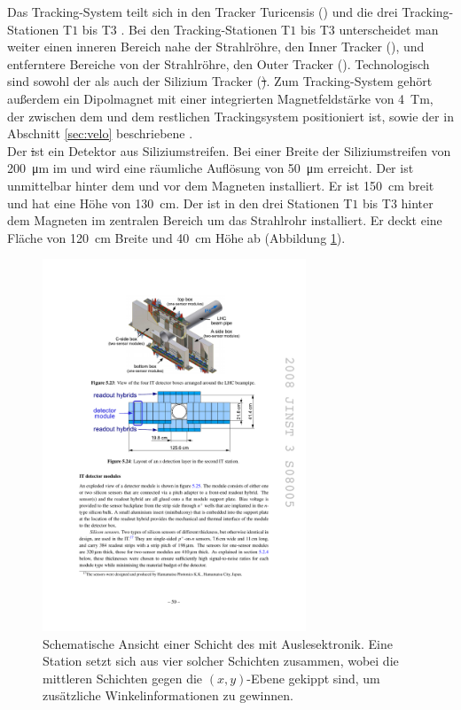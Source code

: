 Das Tracking-System teilt sich in den Tracker Turicensis (\ttracker) und die drei Tracking-Stationen T$1$ bis T$3$ . Bei den Tracking-Stationen T$1$ bis T$3$ unterscheidet man weiter einen inneren Bereich nahe der Strahlröhre, den Inner Tracker (\intr), und entferntere Bereiche von der Strahlröhre, den Outer Tracker (\ot). Technologisch sind sowohl der \ttracker als auch der \intr Silizium Tracker (\st). Zum Tracking-System gehört außerdem ein Dipolmagnet mit einer integrierten Magnetfeldstärke von \SI{4}{Tm}, der zwischen dem \ttracker und dem restlichen Trackingsystem positioniert ist, sowie der in Abschnitt \ref{sec:velo} beschriebene \velo.\\
Der \st ist ein Detektor aus Siliziumstreifen. Bei einer Breite der Siliziumstreifen von \SI{200}{\micro m} im \intr und \ttracker wird eine räumliche Auflösung von \SI{50}{\micro m} erreicht. Der \ttracker ist unmittelbar hinter dem \richone und vor dem Magneten installiert. Er ist \SI{150}{cm} breit und hat eine Höhe von \SI{130}{cm}. Der \intr ist in den drei Stationen  T$1$ bis T$3$ hinter dem Magneten im zentralen Bereich um das Strahlrohr installiert. Er deckt eine Fläche von \SI{120}{cm} Breite und \SI{40}{cm} Höhe ab (Abbildung \ref{fig:it}). 
\begin{figure}[htpb]
	\centering
		\includegraphics[width=0.7\textwidth]{fig/IT.pdf}
	\caption{Schematische Ansicht einer Schicht des \intr mit Auslesektronik. Eine Station setzt sich aus vier solcher Schichten zusammen, wobei die mittleren Schichten gegen die $(x,y)$-Ebene gekippt sind, um zusätzliche Winkelinformationen zu gewinnen. \cite{Alves:2008zz}}
	\label{fig:it} 
\end{figure}\\

